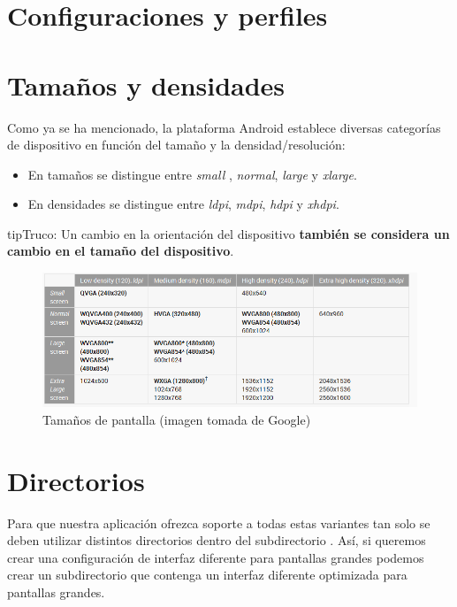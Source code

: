 \documentclass[a4paper,12pt,spanish]{sphinxmanual}
\begin{document}
\section{Configuraciones y perfiles}
\label{tema1:configuraciones-y-perfiles}

\section{Tamaños y densidades}
\label{tema1:tamanos-y-densidades}
Como ya se ha mencionado, la plataforma Android establece diversas categorías de dispositivo en función del tamaño y la densidad/resolución:
\begin{itemize}
\item {} 
En tamaños se distingue entre \emph{small} , \emph{normal}, \emph{large} y \emph{xlarge}.

\item {} 
En densidades se distingue entre \emph{ldpi}, \emph{mdpi}, \emph{hdpi} y \emph{xhdpi}.

\end{itemize}

\begin{notice}{tip}{Truco:}
Un cambio en la orientación del dispositivo \textbf{también se considera un cambio en el tamaño del dispositivo}.
\end{notice}
\begin{figure}[htbp]
\centering
\capstart

\includegraphics{tamaniospantalla.png}
\caption{Tamaños de pantalla (imagen tomada de Google)}\end{figure}


\section{Directorios}
\label{tema1:directorios}
Para que nuestra aplicación ofrezca soporte a todas estas variantes tan solo se deben utilizar distintos directorios  dentro del subdirectorio . Así, si queremos crear una configuración de interfaz diferente para pantallas grandes podemos crear un subdirectorio  que contenga un interfaz diferente optimizada para pantallas grandes.
\end{document}
